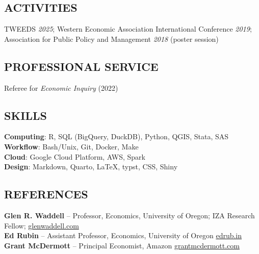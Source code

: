 \documentclass[11pt]{article}
\begin{document}

\subsection*{ACTIVITIES}

TWEEDS \textit{2025}; Western Economic Association International Conference \textit{2019}; Association for Public Policy and Management \textit{2018} (poster session)


\subsection*{PROFESSIONAL SERVICE}
Referee for \textit{Economic Inquiry} (2022)


\subsection*{SKILLS}
\textbf{Computing}: R, SQL (BigQuery, DuckDB), Python, QGIS, Stata, SAS \\
\textbf{Workflow}: Bash/Unix, Git, Docker, Make \\
\textbf{Cloud}: Google Cloud Platform, AWS, Spark \\
\textbf{Design}: Markdown, Quarto, {\charter\LaTeX}, typst, CSS, Shiny \\


\subsection*{REFERENCES}
\textbf{Glen R. Waddell} -- Professor, Economics, University of Oregon; IZA Research Fellow; \href{https://glenwaddell.com}{glenwaddell.com} \\
\textbf{Ed Rubin} -- Assistant Professor, Economics, University of Oregon \href{https://edrub.in}{edrub.in} \\
\textbf{Grant McDermott} -- Principal Economist, Amazon \href{https://grantmcdermott.com/}{grantmcdermott.com} \\
\end{document}
